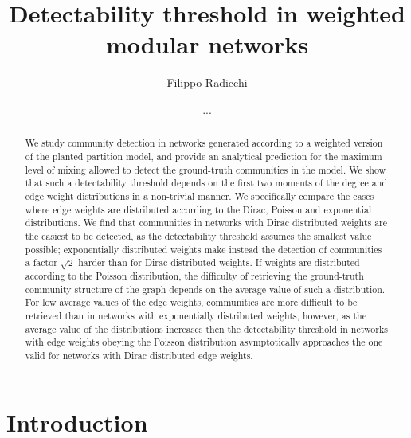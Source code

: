 \documentclass[a4paper,pre,superscriptaddress,floatfix,nofootinbib,twocolumn]{revtex4-1}
\begin{document}
\title{Detectability threshold in weighted modular networks}



\author{Filippo Radicchi}

  \author{...}


\begin{abstract}
We study community detection in networks generated according to a weighted version of the planted-partition model, and
provide an analytical prediction for the maximum level of mixing allowed to detect the ground-truth communities in the model. We show that
such a detectability threshold depends on the first two moments of the degree and edge weight distributions in a non-trivial manner.
We specifically compare the cases where edge weights are distributed according to the Dirac, Poisson and exponential distributions. We find that communities in networks with Dirac distributed weights are the easiest to be detected, as the detectability threshold assumes the smallest value possible; exponentially distributed weights make instead the detection of communities a factor $\sqrt{2}$ harder than for Dirac distributed weights. If weights are distributed according to the Poisson distribution, the difficulty of retrieving the ground-truth community structure of the graph depends on the average value of such a distribution. For low average values of the edge weights, communities are more difficult to be retrieved than in networks with exponentially distributed weights, however, as the average value of the distributions increases then the detectability threshold in networks with edge weights obeying the Poisson distribution asymptotically approaches the one valid for networks with Dirac distributed edge weights.
\end{abstract}




\maketitle

\section*{Introduction}
\end{document}
